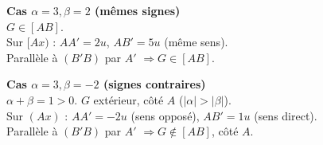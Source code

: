 \documentclass[11pt]{article}
\begin{document}
\begin{exemplebox}
\begin{minipage}{0.48\linewidth}
\textbf{Cas $\alpha=3, \beta=2$ (mêmes signes)} \\
$G \in [AB]$. \\
Sur $[Ax)$ : $AA' = 2u$, $AB' = 5u$ (même sens). \\
Parallèle à $(B'B)$ par $A'$ $\Rightarrow G \in [AB]$.
\end{minipage}
\hfill
\begin{minipage}{0.48\linewidth}
\textbf{Cas $\alpha=3, \beta=-2$ (signes contraires)} \\
$\alpha+\beta=1 > 0$. $G$ extérieur, côté $A$ ($|\alpha|>|\beta|$). \\
Sur $(Ax)$ : $AA' = -2u$ (sens opposé), $AB' = 1u$ (sens direct). \\
Parallèle à $(B'B)$ par $A'$ $\Rightarrow G \notin [AB]$, côté $A$.
\end{minipage}
\end{exemplebox}
\end{document}
